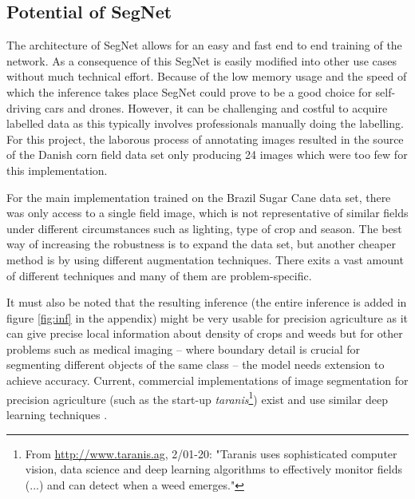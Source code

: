 \documentclass{article}
\begin{document}


\subsection{Potential of SegNet}
The architecture of SegNet allows for an easy and fast end to end training of the network. As a consequence of this SegNet is easily modified into other use cases without much technical effort. Because of the low memory usage and the speed of which the inference takes place SegNet could prove to be a good choice for self-driving cars and drones. However, it can be challenging and costful to acquire labelled data as this typically involves professionals manually doing the labelling. For this project, the laborous process of annotating images resulted in the source of the Danish corn field data set only producing 24 images which were too few for this implementation.

For the main implementation trained on the Brazil Sugar Cane data set, there was only access to a single field image, which is not representative of similar fields under different circumstances such as lighting, type of crop and season. The best way of increasing the robustness is to expand the data set, but another cheaper method is by using different augmentation techniques. There exits a vast amount of different techniques and many of them are problem-specific. 

It must also be noted that the resulting inference (the entire inference is added in figure \ref{fig:inf} in the appendix) might be very usable for precision agriculture as it can give precise local information about density of crops and weeds but for other problems such as medical imaging -- where boundary detail is crucial for segmenting different objects of the same class -- the model needs extension to achieve accuracy.  Current, commercial implementations of image segmentation for precision agriculture (such as the start-up \textit{taranis}\footnote{From \url{http://www.taranis.ag}, 2/01-20: "Taranis uses sophisticated computer vision, data science and deep learning algorithms to effectively monitor fields (...) and can detect when a weed emerges."  }) exist and use similar deep learning techniques \cite{brazil}.
\vspace*{-.5cm}
\end{document}
